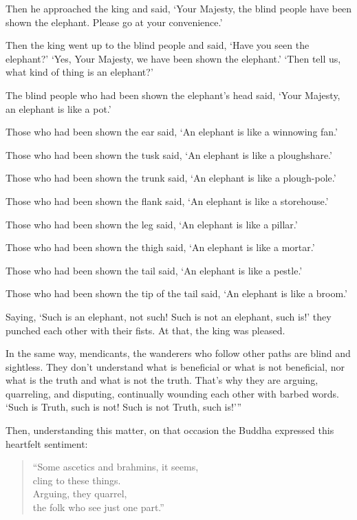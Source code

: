 \documentclass[12pt,openany]{book}%
\begin{document}
Then he approached the king and said, ‘Your Majesty, the blind people have been shown the elephant. Please go at your convenience.’ 

Then the king went up to the blind people and said, ‘Have you seen the elephant?’ ‘Yes, Your Majesty, we have been shown the elephant.’ ‘Then tell us, what kind of thing is an elephant?’ 

The blind people who had been shown the elephant’s head said, ‘Your Majesty, an elephant is like a pot.’ 

Those who had been shown the ear said, ‘An elephant is like a winnowing fan.’ 

Those who had been shown the tusk said, ‘An elephant is like a ploughshare.’ 

Those who had been shown the trunk said, ‘An elephant is like a plough-pole.’ 

Those who had been shown the flank said, ‘An elephant is like a storehouse.’ 

Those who had been shown the leg said, ‘An elephant is like a pillar.’ 

Those who had been shown the thigh said, ‘An elephant is like a mortar.’ 

Those who had been shown the tail said, ‘An elephant is like a pestle.’ 

Those who had been shown the tip of the tail said, ‘An elephant is like a broom.’ 

Saying, ‘Such is an elephant, not such! Such is not an elephant, such is!’ they punched each other with their fists. At that, the king was pleased. 

In the same way, mendicants, the wanderers who follow other paths are blind and sightless. They don't understand what is beneficial or what is not beneficial, nor what is the truth and what is not the truth. That’s why they are arguing, quarreling, and disputing, continually wounding each other with barbed words. ‘Such is Truth, such is not! Such is not Truth, such is!’” 

Then, understanding this matter, on that occasion the Buddha expressed this heartfelt sentiment: 

\begin{verse}%
“Some ascetics and brahmins, it seems, \\
cling to these things. \\
Arguing, they quarrel, \\
the folk who see just one part.” 

%
\end{verse}
\end{document}

